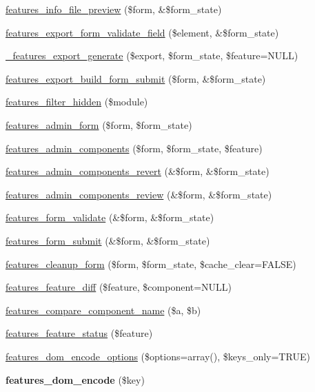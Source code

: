 \begin{DoxyCompactItemize}
\item 
\hyperlink{features_8admin_8inc_ae0ae3dedd9038d99255ca4ba04ed4263}{features\_\-info\_\-file\_\-preview} (\$form, \&\$form\_\-state)
\item 
\hyperlink{features_8admin_8inc_a958b7918ee49cbc5e079c02bf89cbb18}{features\_\-export\_\-form\_\-validate\_\-field} (\$element, \&\$form\_\-state)
\item 
\hyperlink{features_8admin_8inc_aa105fdb0198373e24dfbe6ae4d096412}{\_\-features\_\-export\_\-generate} (\$export, \$form\_\-state, \$feature=NULL)
\item 
\hyperlink{features_8admin_8inc_afb232d8f40ae6b186567c6091ef0550e}{features\_\-export\_\-build\_\-form\_\-submit} (\$form, \&\$form\_\-state)
\item 
\hyperlink{features_8admin_8inc_af7babbb51d0f379d5310298efa9ad49b}{features\_\-filter\_\-hidden} (\$module)
\item 
\hyperlink{features_8admin_8inc_a8f441a812db67e37b193c1d3e8a78142}{features\_\-admin\_\-form} (\$form, \$form\_\-state)
\item 
\hyperlink{features_8admin_8inc_a067c23732eead05d84bf72fe3aec700e}{features\_\-admin\_\-components} (\$form, \$form\_\-state, \$feature)
\item 
\hyperlink{features_8admin_8inc_a7f63d61d90f74c8c0f61436393ab408a}{features\_\-admin\_\-components\_\-revert} (\&\$form, \&\$form\_\-state)
\item 
\hyperlink{features_8admin_8inc_a679e838f6eeba57c2be406f1ea6fae25}{features\_\-admin\_\-components\_\-review} (\&\$form, \&\$form\_\-state)
\item 
\hyperlink{features_8admin_8inc_a1017a5ace13ebdae60df70e4c6a8a07b}{features\_\-form\_\-validate} (\&\$form, \&\$form\_\-state)
\item 
\hyperlink{features_8admin_8inc_aca8adc8cb8a97cb12de36aed64449993}{features\_\-form\_\-submit} (\&\$form, \&\$form\_\-state)
\item 
\hyperlink{features_8admin_8inc_ab9ed5d0e49a2ed5a61db90436d44f06f}{features\_\-cleanup\_\-form} (\$form, \$form\_\-state, \$cache\_\-clear=FALSE)
\item 
\hyperlink{features_8admin_8inc_a4865491ed8883d5be90311f3248bb785}{features\_\-feature\_\-diff} (\$feature, \$component=NULL)
\item 
\hyperlink{features_8admin_8inc_aacaefdede8dd5662e94053f3fc2bfd99}{features\_\-compare\_\-component\_\-name} (\$a, \$b)
\item 
\hyperlink{features_8admin_8inc_a5a9ff088b5c6f067e95335ec71556680}{features\_\-feature\_\-status} (\$feature)
\item 
\hyperlink{features_8admin_8inc_a023d4e66b2b73133fc99abf9e14a8f96}{features\_\-dom\_\-encode\_\-options} (\$options=array(), \$keys\_\-only=TRUE)
\item 
\hypertarget{features_8admin_8inc_a62774b1a8ce7f158c58003865ed80aba}{
{\bfseries features\_\-dom\_\-encode} (\$key)}
\label{features_8admin_8inc_a62774b1a8ce7f158c58003865ed80aba}


\end{DoxyCompactItemize}
